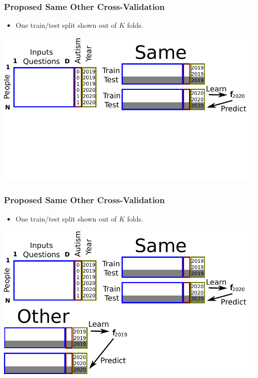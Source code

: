 \documentclass{beamer}
\begin{document}
\begin{frame}
  \frametitle{Proposed Same Other Cross-Validation}
  \begin{itemize}
  \item One train/test split shown out of $K$ folds.
  \end{itemize}
  \includegraphics[width=\textwidth]{drawing-cv-same-other-years-2.pdf}
\end{frame}

\begin{frame}
  \frametitle{Proposed Same Other Cross-Validation}
  \begin{itemize}
  \item One train/test split shown out of $K$ folds.
  \end{itemize}
  \includegraphics[width=\textwidth]{drawing-cv-same-other-years-3.pdf}
\end{frame}
\end{document}
